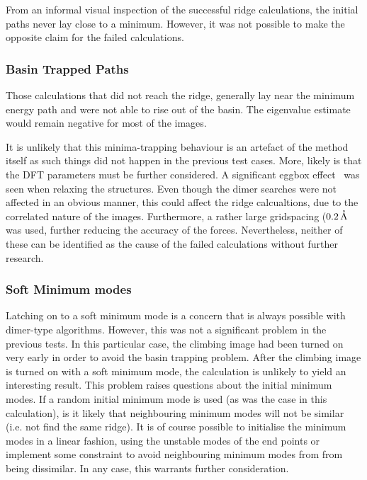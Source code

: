 From an informal visual inspection of the successful ridge calculations, the initial paths never lay close to a minimum.
However, it was not possible to make the opposite claim for the failed calculations.

\subsubsection{Basin Trapped Paths}
Those calculations that did not reach the ridge, generally lay near the minimum energy path and were not able to rise out of the basin.
The eigenvalue estimate would remain negative for most of the images.

It is unlikely that this minima-trapping behaviour is an artefact of the method itself as such things did not happen in the previous test cases.
More, likely is that the DFT parameters must be further considered.
A significant eggbox effect~\cite{gpaw-2005} was seen when relaxing the structures.
Even though the dimer searches were not affected in an obvious manner, this could affect the ridge calcualtions, due to the correlated nature of the images.
Furthermore, a rather large gridspacing ($0.2 \, \mathrm{\mathring{\mathrm{A}}}$ was used, further reducing the accuracy of the forces.
Nevertheless, neither of these can be identified as the cause of the failed calculations without further research.

\subsubsection{Soft Minimum modes}
Latching on to a soft minimum mode is a concern that is always possible with dimer-type algorithms.
However, this was not a significant problem in the previous tests.
In this particular case, the climbing image had been turned on very early in order to avoid the basin trapping problem.
After the climbing image is turned on with a soft minimum mode, the calculation is unlikely to yield an interesting result.
This problem raises questions about the initial minimum modes.
If a random initial minimum mode is used (as was the case in this calculation), is it likely that neighbouring minimum modes will not be similar (i.e. not find the same ridge).
It is of course possible to initialise the minimum modes in a linear fashion, using the unstable modes of the end points or implement some constraint to avoid neighbouring minimum modes from from being dissimilar.
In any case, this warrants further consideration.

